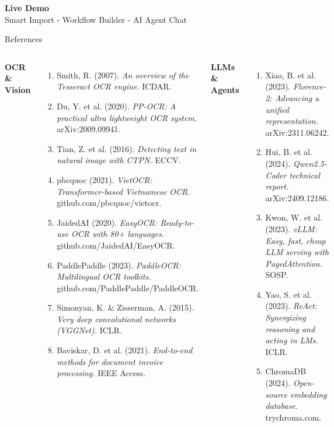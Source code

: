 \documentclass[10pt,aspectratio=169]{beamer}
\begin{document}
\begin{frame}{}
    \centering
    \vspace{1.5cm}
    {\Huge\bfseries Live Demo}\\[0.5cm]
    {\large Smart Import - Workflow Builder - AI Agent Chat}\\[1cm]
\end{frame}

\begin{frame}{References}
    \tiny
    \begin{columns}[T]
        \textbf{OCR \& Vision}
        \begin{enumerate}
            \item[{[1]}] Smith, R. (2007). \textit{An overview of the Tesseract OCR engine.} ICDAR.
            \item[{[2]}] Du, Y. et al. (2020). \textit{PP-OCR: A practical ultra lightweight OCR system.} arXiv:2009.09941.
            \item[{[3]}] Tian, Z. et al. (2016). \textit{Detecting text in natural image with CTPN.} ECCV.
            \item[{[4]}] pbcquoc (2021). \textit{VietOCR: Transformer-based Vietnamese OCR.} github.com/pbcquoc/vietocr.
            \item[{[5]}] JaidedAI (2020). \textit{EasyOCR: Ready-to-use OCR with 80+ languages.} github.com/JaidedAI/EasyOCR.
            \item[{[6]}] PaddlePaddle (2023). \textit{PaddleOCR: Multilingual OCR toolkits.} github.com/PaddlePaddle/PaddleOCR.
            \item[{[7]}] Simonyan, K. \& Zisserman, A. (2015). \textit{Very deep convolutional networks (VGGNet).} ICLR.
            \item[{[8]}] Baviskar, D. et al. (2021). \textit{End-to-end methods for document invoice processing.} IEEE Access.
        \end{enumerate}
        \vspace{0.05cm}
        \textbf{LLMs \& Agents}
        \begin{enumerate}
            \item[{[9]}] Xiao, B. et al. (2023). \textit{Florence-2: Advancing a unified representation.} arXiv:2311.06242.
            \item[{[10]}] Hui, B. et al. (2024). \textit{Qwen2.5-Coder technical report.} arXiv:2409.12186.
            \item[{[11]}] Kwon, W. et al. (2023). \textit{vLLM: Easy, fast, cheap LLM serving with PagedAttention.} SOSP.
            \item[{[12]}] Yao, S. et al. (2023). \textit{ReAct: Synergizing reasoning and acting in LMs.} ICLR.
            \item[{[13]}] ChromaDB (2024). \textit{Open-source embedding database.} trychroma.com.
        \end{enumerate}


\end{columns}
\end{frame}
\end{document}
